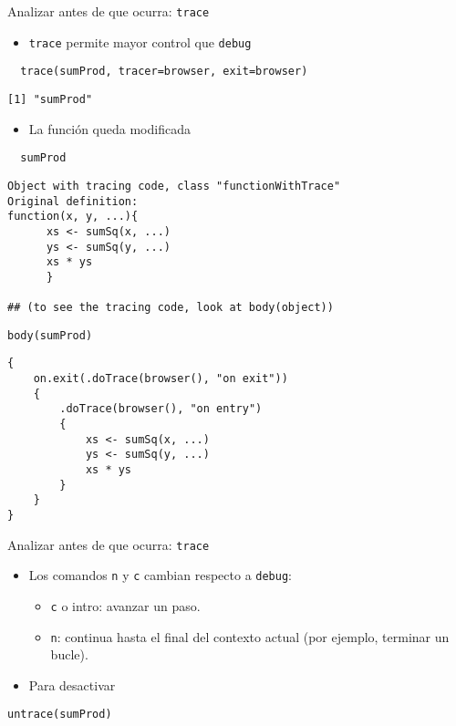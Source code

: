 \documentclass[xcolor={usenames,svgnames,dvipsnames}]{beamer}
\begin{document}
\begin{frame}[fragile,label={sec:orgheadline22}]{Analizar antes de que ocurra: \texttt{trace}}
 \begin{itemize}
\item \texttt{trace} permite mayor control que \texttt{debug}
\end{itemize}
\lstset{language=R,label= ,caption= ,captionpos=b,numbers=none}
\begin{lstlisting}
  trace(sumProd, tracer=browser, exit=browser)
\end{lstlisting}

\begin{verbatim}
[1] "sumProd"
\end{verbatim}

\begin{itemize}
\item La función queda modificada
\end{itemize}
\lstset{language=R,label= ,caption= ,captionpos=b,numbers=none}
\begin{lstlisting}
  sumProd
\end{lstlisting}

\begin{verbatim}
Object with tracing code, class "functionWithTrace"
Original definition: 
function(x, y, ...){
      xs <- sumSq(x, ...)
      ys <- sumSq(y, ...)
      xs * ys
      }

## (to see the tracing code, look at body(object))
\end{verbatim}

\lstset{language=R,label= ,caption= ,captionpos=b,numbers=none}
\begin{lstlisting}
body(sumProd)
\end{lstlisting}

\begin{verbatim}
{
    on.exit(.doTrace(browser(), "on exit"))
    {
        .doTrace(browser(), "on entry")
        {
            xs <- sumSq(x, ...)
            ys <- sumSq(y, ...)
            xs * ys
        }
    }
}
\end{verbatim}
\end{frame}

\begin{frame}[fragile,label={sec:orgheadline23}]{Analizar antes de que ocurra: \texttt{trace}}
 \begin{itemize}
\item Los comandos \texttt{n} y \texttt{c} cambian respecto a \texttt{debug}:
\begin{itemize}
\item \texttt{c} o intro: avanzar un paso.
\item \texttt{n}: continua hasta el final del contexto actual (por ejemplo,
terminar un bucle).
\end{itemize}
\item Para desactivar
\end{itemize}
\lstset{language=R,label= ,caption= ,captionpos=b,numbers=none}
\begin{lstlisting}
untrace(sumProd)
\end{lstlisting}
\end{frame}
\end{document}
